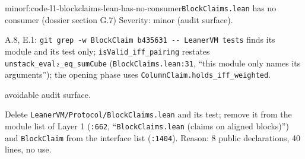 \begin{finding}{minor}{f:code-l1-blockclaims-lean-has-no-consumer}{\texttt{BlockClaims.\allowbreak{}lean} has no consumer (dossier section G.7)}
Severity: minor (audit surface).

A.8, E.1: \texttt{g\allowbreak{}i\allowbreak{}t\allowbreak{} g\allowbreak{}r\allowbreak{}e\allowbreak{}p\allowbreak{} -{}\allowbreak{}w\allowbreak{} B\allowbreak{}l\allowbreak{}o\allowbreak{}c\allowbreak{}k\allowbreak{}C\allowbreak{}l\allowbreak{}a\allowbreak{}i\allowbreak{}m\allowbreak{} b\allowbreak{}4\allowbreak{}3\allowbreak{}5\allowbreak{}6\allowbreak{}3\allowbreak{}1\allowbreak{} -{}\allowbreak{}-{}\allowbreak{} L\allowbreak{}e\allowbreak{}a\allowbreak{}n\allowbreak{}e\allowbreak{}r\allowbreak{}V\allowbreak{}M\allowbreak{} t\allowbreak{}e\allowbreak{}s\allowbreak{}t\allowbreak{}s} finds its module and its test only; \texttt{isValid\_\allowbreak{}iff\_\allowbreak{}pairing} restates \texttt{unstack\_\allowbreak{}eval₂\_\allowbreak{}eq\_\allowbreak{}sumCube} (\texttt{BlockClaims.\allowbreak{}lean:31}, \enquote{this module only names its arguments}); the opening phase uses \texttt{C\allowbreak{}o\allowbreak{}l\allowbreak{}u\allowbreak{}m\allowbreak{}n\allowbreak{}C\allowbreak{}l\allowbreak{}a\allowbreak{}i\allowbreak{}m\allowbreak{}.\allowbreak{}h\allowbreak{}o\allowbreak{}l\allowbreak{}d\allowbreak{}s\allowbreak{}\_\allowbreak{}i\allowbreak{}f\allowbreak{}f\allowbreak{}\_\allowbreak{}w\allowbreak{}e\allowbreak{}i\allowbreak{}g\allowbreak{}h\allowbreak{}t\allowbreak{}e\allowbreak{}d}.

avoidable audit surface.

Delete \texttt{L\allowbreak{}e\allowbreak{}a\allowbreak{}n\allowbreak{}e\allowbreak{}r\allowbreak{}V\allowbreak{}M\allowbreak{}/\allowbreak{}P\allowbreak{}r\allowbreak{}o\allowbreak{}t\allowbreak{}o\allowbreak{}c\allowbreak{}o\allowbreak{}l\allowbreak{}/\allowbreak{}B\allowbreak{}l\allowbreak{}o\allowbreak{}c\allowbreak{}k\allowbreak{}C\allowbreak{}l\allowbreak{}a\allowbreak{}i\allowbreak{}m\allowbreak{}s\allowbreak{}.\allowbreak{}l\allowbreak{}e\allowbreak{}a\allowbreak{}n} and its test; remove it from the module list of Layer 1 (\texttt{:662}, \enquote{\texttt{BlockClaims.\allowbreak{}lean} (claims on aligned blocks)}) and \texttt{BlockClaim} from the interface list (\texttt{:1404}). Reason: 8 public declarations, 40 lines, no use.

\end{finding}

